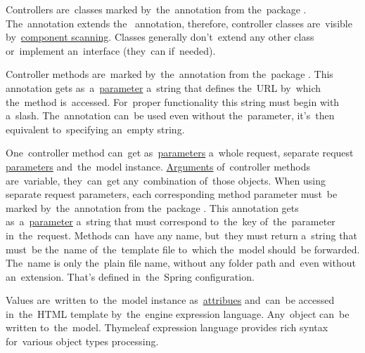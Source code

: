 \noindent Controllers are~classes marked by~the~annotation  from the~package .
The~annotation extends the~ annotation, therefore, controller classes are~visible by~\hyperref[iocannotations]{component scanning}.
Classes generally don't~extend any other class or~implement an~interface (they~can if~needed).

Controller methods are~marked by~the~annotation  from the~package .
This annotation gets as~a~\hyperref[parameterargument]{parameter} a~string that defines the~URL by~which the~method is~accessed.
For~proper functionality this string must begin with a~slash.
The~annotation can~be used even without the~parameter, it's~then equivalent to~specifying an~empty string.

One~controller method can~get as~\hyperref[parameterargument]{parameters} a~whole request, separate request \hyperref[jspattributeparameter]{parameters} and~the~model instance.
\hyperref[parameterargument]{Arguments} of~controller methods are~variable, they~can~get any~combination of~those objects.
When using separate request parameters, each corresponding method parameter must~be marked by~the~annotation  from the~package .
This annotation gets as~a~\hyperref[parameterargument]{parameter} a~string that must correspond to~the~key of~the~parameter in~the~request.
Methods can~have any name, but~they must return a~string that must~be the~name of~the~template file to~which the~model should~be forwarded.
The~name is only the~plain file name, without any folder path and~even without an~extension.
That's defined in~the~Spring configuration.

Values are~written to~the~model instance as~\hyperref[jspattributeparameter]{attribues} and~can~be accessed in~the~HTML template by~the~engine expression language.
Any~object can~be written to~the~model.
Thymeleaf expression language provides rich syntax for~various object types processing.
\newpage

